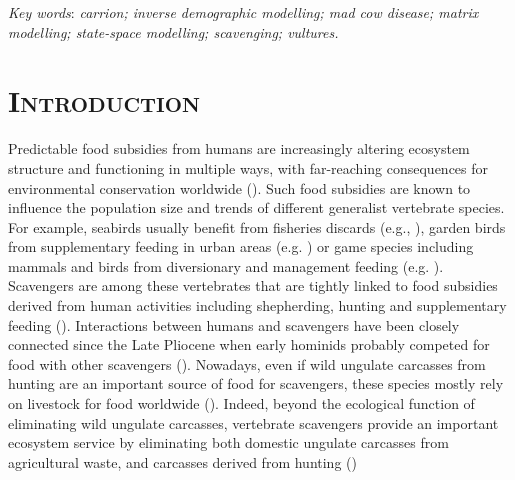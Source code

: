 \documentclass[12pt]{article}
\begin{document}
\textit{Key words}:  \textit{carrion; inverse demographic modelling; mad cow disease; matrix modelling; state-space modelling; scavenging; vultures.}

\vspace*{0.5in}

\section*{\textsc{Introduction}}

Predictable food subsidies from humans are increasingly altering ecosystem structure and functioning in multiple ways, with far-reaching consequences for environmental conservation worldwide (\cite{Oro2013}). Such food subsidies are known to influence the population size and trends of different generalist vertebrate species. For example, seabirds usually benefit from fisheries discards (e.g., \cite{Bicknell2013}), garden birds from supplementary feeding in urban areas (e.g. \cite{Fuller2008}) or game species including mammals and birds from diversionary and management feeding (e.g. \cite{Putman2004}). Scavengers are among these vertebrates that are tightly linked to food subsidies derived from human activities including shepherding, hunting and supplementary feeding (\cite{Donazar1993,Mateo-Tomas2010b,Blanco2014,Cortes-Avizanda2016}). Interactions between humans and scavengers have been closely connected since the Late Pliocene when early hominids probably competed for food with other scavengers (\cite{Moleon2014}). Nowadays, even if wild ungulate carcasses from hunting are an important source of food for scavengers, these species mostly rely on livestock for food worldwide (\cite{Donazar1993,Mateo-Tomas2015,Lambertucci2009,Lambertucci2018}). Indeed, beyond the ecological function of eliminating wild ungulate carcasses, vertebrate scavengers provide an important ecosystem service by eliminating both domestic ungulate carcasses from agricultural waste, and carcasses derived from hunting (\cite{Moleon2014a,Morales-Reyes2015})\\
\end{document}
